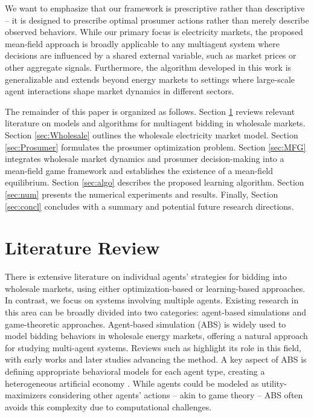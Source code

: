 \documentclass{article}
\theoremstyle{definition}
\theoremstyle{plain}
\begin{document}
We want to emphasize that our framework is prescriptive rather than descriptive -- it is designed to prescribe optimal prosumer actions rather than merely describe observed behaviors. While our primary focus is electricity markets, the proposed mean-field approach is broadly applicable to any multiagent system where decisions are influenced by a shared external variable, such as market prices or other aggregate signals. Furthermore, the algorithm developed in this work is generalizable and extends beyond energy markets to settings where large-scale agent interactions shape market dynamics in different sectors.

The remainder of this paper is organized as follows. Section \ref{sec:lit} reviews relevant literature on models and algorithms for multiagent bidding in wholesale markets.  Section \ref{sec:Wholesale} outlines the wholesale electricity market model. Section \ref{sec:Prosumer} formulates the prosumer optimization problem. Section \ref{sec:MFG} integrates wholesale market dynamics and prosumer decision-making into a mean-field game framework and establishes the existence of a mean-field equilibrium. Section \ref{sec:algo} describes the proposed learning algorithm. Section \ref{sec:num} presents the numerical experiments and results. Finally, Section \ref{sec:concl} concludes with a summary and potential future research directions.


\section{Literature Review}
\label{sec:lit}
There is extensive literature on individual agents' strategies for bidding into wholesale markets, using either optimization-based or learning-based approaches. In contrast, we focus on systems involving multiple agents. Existing research in this area can be broadly divided into two categories: agent-based simulations and game-theoretic approaches. 
Agent-based simulation (ABS) is widely used to model bidding behaviors in wholesale energy markets, offering a natural approach for studying multi-agent systems. Reviews such as \cite{ABS_Review1, ABS_Review2, ABS_BookChapter} highlight its role in this field, with early works \cite{ABS_Price} and later studies \cite{ArgonneABS1, ArgonneABS2, shafie2014stochastic} advancing the method. A key aspect of ABS is defining appropriate behavioral models for each agent type, creating a heterogeneous artificial economy \citep{ABS_BookChapter}. While agents could be modeled as utility-maximizers considering other agents' actions -- akin to game theory -- ABS often avoids this complexity due to computational challenges.
\end{document}
